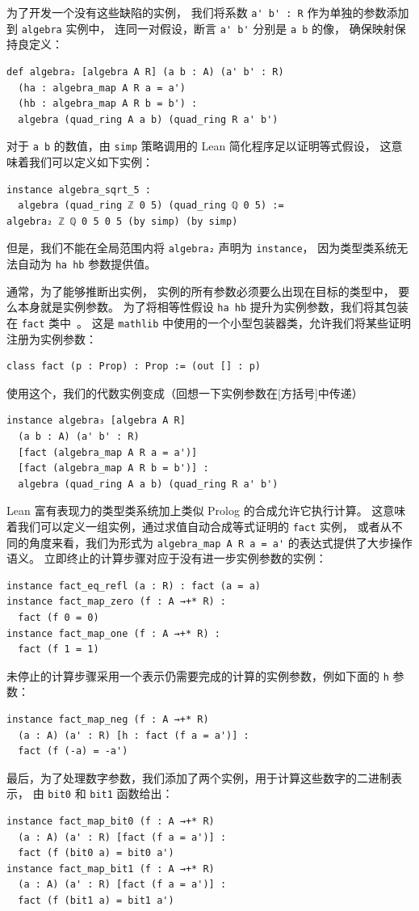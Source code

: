 \documentclass[sigplan,10pt,nonacm,
screen]{acmart} \settopmatter{printfolios=true,printccs=false,printacmref=false}
\newcommand{\mathlib}{\lstinline{mathlib}\xspace}
\begin{document}
为了开发一个没有这些缺陷的实例，
我们将系数 \lstinline{a' b' : R} 作为单独的参数添加到 \lstinline{algebra} 实例中，
连同一对假设，断言 \lstinline{a' b'} 分别是 \lstinline{a b} 的像，
确保映射保持良定义：
\begin{lstlisting}
def algebra₂ [algebra A R] (a b : A) (a' b' : R)
  (ha : algebra_map A R a = a')
  (hb : algebra_map A R b = b') :
  algebra (quad_ring A a b) (quad_ring R a' b')
\end{lstlisting}
对于 \lstinline{a b} 的数值，由 \lstinline{simp} 策略调用的 Lean 简化程序足以证明等式假设，
这意味着我们可以定义如下实例：
\begin{lstlisting}
instance algebra_sqrt_5 :
  algebra (quad_ring ℤ 0 5) (quad_ring ℚ 0 5) :=
algebra₂ ℤ ℚ 0 5 0 5 (by simp) (by simp)
\end{lstlisting}
但是，我们不能在全局范围内将 \lstinline{algebra₂} 声明为 \lstinline{instance}，
因为类型类系统无法自动为 \lstinline{ha hb} 参数提供值。

通常，为了能够推断出实例，
实例的所有参数必须要么出现在目标的类型中，
要么本身就是实例参数。
为了将相等性假设 \lstinline{ha hb} 提升为实例参数，我们将其包装在 \lstinline{fact} 类中~\cite{typeclasses}。
这是 \mathlib 中使用的一个小型包装器类，允许我们将某些证明注册为实例参数：
\begin{lstlisting}
class fact (p : Prop) : Prop := (out [] : p)
\end{lstlisting}
使用这个，我们的代数实例变成（回想一下实例参数在[方括号]中传递）
\begin{lstlisting}
instance algebra₃ [algebra A R]
  (a b : A) (a' b' : R)
  [fact (algebra_map A R a = a')]
  [fact (algebra_map A R b = b')] :
  algebra (quad_ring A a b) (quad_ring R a' b')
\end{lstlisting}
Lean 富有表现力的类型类系统加上类似 Prolog 的合成允许它执行计算。
这意味着我们可以定义一组实例，通过求值自动合成等式证明的 \lstinline{fact} 实例，
或者从不同的角度来看，我们为形式为 \lstinline{algebra_map A R a = a'} 的表达式提供了大步操作语义。
立即终止的计算步骤对应于没有进一步实例参数的实例：
\begin{lstlisting}
instance fact_eq_refl (a : R) : fact (a = a)
instance fact_map_zero (f : A →+* R) :
  fact (f 0 = 0)
instance fact_map_one (f : A →+* R) :
  fact (f 1 = 1)
\end{lstlisting}
未停止的计算步骤采用一个表示仍需要完成的计算的实例参数，例如下面的 \lstinline{h} 参数：
\begin{lstlisting}
instance fact_map_neg (f : A →+* R)
  (a : A) (a' : R) [h : fact (f a = a')] :
  fact (f (-a) = -a')
\end{lstlisting}
最后，为了处理数字参数，我们添加了两个实例，用于计算这些数字的二进制表示，
由 \lstinline{bit0} 和 \lstinline{bit1} 函数给出：
\begin{lstlisting}
instance fact_map_bit0 (f : A →+* R)
  (a : A) (a' : R) [fact (f a = a')] :
  fact (f (bit0 a) = bit0 a')
instance fact_map_bit1 (f : A →+* R)
  (a : A) (a' : R) [fact (f a = a')] :
  fact (f (bit1 a) = bit1 a')
\end{lstlisting}
\end{document}
